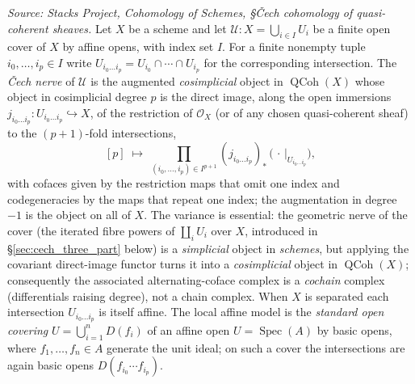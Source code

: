 \begin{definition}\leanok
  \label{def:cech_nerve}
  \textit{Source: Stacks Project, Cohomology of Schemes, \S{\v C}ech cohomology of
  quasi-coherent sheaves.}
  Let \(X\) be a scheme and let
  \(\mathcal{U} : X = \bigcup_{i \in I} U_i\) be a finite open cover of \(X\) by
  affine opens, with index set \(I\). For a finite nonempty tuple
  \(i_0, \ldots, i_p \in I\) write
  \(U_{i_0 \ldots i_p} = U_{i_0} \cap \cdots \cap U_{i_p}\) for the corresponding
  intersection. The \emph{{\v C}ech nerve} of \(\mathcal{U}\) is the augmented
  \emph{cosimplicial} object in \(\operatorname{QCoh}(X)\) whose object in
  cosimplicial degree \(p\) is the direct image, along the open immersions
  \(j_{i_0 \ldots i_p} : U_{i_0 \ldots i_p} \hookrightarrow X\), of the restriction
  of \(\mathcal{O}_X\) (or of any chosen quasi-coherent sheaf) to the
  \((p+1)\)-fold intersections,
  \[
    [p] \;\longmapsto\;
      \prod_{(i_0, \ldots, i_p) \in I^{p+1}}
        (j_{i_0 \ldots i_p})_* \,\bigl(\,\cdot\,|_{U_{i_0 \ldots i_p}}\bigr),
  \]
  with cofaces given by the restriction maps that omit one index and
  codegeneracies by the maps that repeat one index; the augmentation in degree
  \(-1\) is the object on all of \(X\). The variance is essential: the geometric
  nerve of the cover (the iterated fibre powers of \(\coprod_i U_i\) over \(X\),
  introduced in \S\ref{sec:cech_three_part} below) is a \emph{simplicial} object
  in \emph{schemes}, but applying the covariant direct-image functor turns it into
  a \emph{cosimplicial} object in \(\operatorname{QCoh}(X)\); consequently the
  associated alternating-coface complex is a \emph{cochain} complex (differentials
  raising degree), not a chain complex. When \(X\) is separated each intersection
  \(U_{i_0 \ldots i_p}\) is itself affine. The local affine model is the
  \emph{standard open covering} \(U = \bigcup_{i=1}^n D(f_i)\) of an affine open
  \(U = \operatorname{Spec}(A)\) by basic opens, where \(f_1, \ldots, f_n \in A\)
  generate the unit ideal; on such a cover the intersections are again basic opens
  \(D(f_{i_0} \cdots f_{i_p})\).
\end{definition}


